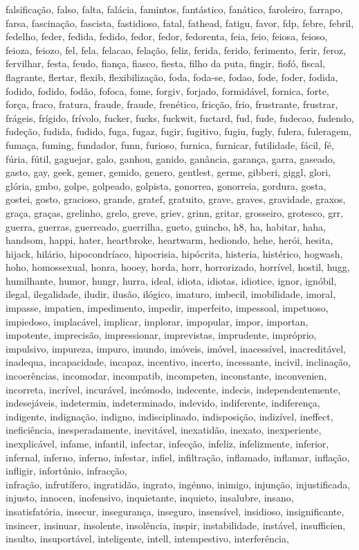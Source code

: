 falsificação, falso, falta, falácia, famintos, fantástico, fanático, faroleiro, farrapo, farsa, fascinação, fascista, fastidioso, fatal, fathead, fatigu, favor, fdp, febre, febril, fedelho, feder, fedida, fedido, fedor, fedor, fedorenta, feia, feio, feiosa, feioso, feioza, feiozo, fel, fela, felacao, felação, feliz, ferida, ferido, ferimento, ferir, feroz, fervilhar, festa, feudo, fiança, fiasco, fiesta, filho da puta, fingir, fiofó, fiscal, flagrante, flertar, flexib, flexibilização, foda, foda-se, fodao, fode, foder, fodida, fodido, fodido, fodão, fofoca, fome, forgiv, forjado, formidável, fornica, forte, força, fraco, fratura, fraude, fraude, frenético, fricção, frio, frustrante, frustrar, frágeis, frígido, frívolo, fucker, fucks, fuckwit, fuctard, fud, fude, fudecao, fudendo, fudeção, fudida, fudido, fuga, fugaz, fugir, fugitivo, fugiu, fugly, fulera, fuleragem, fumaça, fuming, fundador, funn, furioso, furnica, furnicar, futilidade, fácil, fé, fúria, fútil, gaguejar, galo, ganhou, ganido, ganância, garança, garra, gaseado, gasto, gay, geek, gemer, gemido, genero, gentlest, germe, gibberi, giggl, glori, glória, gmbo, golpe, golpeado, golpista, gonorrea, gonorreia, gordura, gosta, gostei, gosto, gracioso, grande, gratef, gratuito, grave, graves, gravidade, graxos, graça, graças, grelinho, grelo, greve, griev, grinn, gritar, grosseiro, grotesco, grr, guerra, guerras, guerreado, guerrilha, gueto, guincho, h8, ha, habitar, haha, handsom, happi, hater, heartbroke, heartwarm, hediondo, hehe, herói, hesita, hijack, hilário, hipocondríaco, hipocrisia, hipócrita, histeria, histérico, hogwash, hoho, homossexual, honra, hooey, horda, horr, horrorizado, horrível, hostil, hugg, humilhante, humor, hungr, hurra, ideal, idiota, idiotas, idiotice, ignor, ignóbil, ilegal, ilegalidade, iludir, ilusão, ilógico, imaturo, imbecil, imobilidade, imoral, impasse, impatien, impedimento, impedir, imperfeito, impessoal, impetuoso, impiedoso, implacável, implicar, implorar, impopular, impor, importan, impotente, imprecisão, impressionar, imprevistas, imprudente, impróprio, impulsivo, impureza, impuro, imundo, imóveis, imóvel, inacessível, inacreditável, inadequa, incapacidade, incapaz, incentivo, incerto, incessante, incivil, inclinação, incoerências, incomodar, incompatib, incompeten, inconstante, inconvenien, incorreta, incrível, incurável, incómodo, indecente, indecis, independentemente, indesejáveis, indetermin, indeterminado, indevido, indiferente, indiferença, indigente, indignação, indigno, indisciplinado, indisposição, indizível, ineffect, ineficiência, inesperadamente, inevitável, inexatidão, inexato, inexperiente, inexplicável, infame, infantil, infectar, infecção, infeliz, infelizmente, inferior, infernal, inferno, inferno, infestar, infiel, infiltração, inflamado, inflamar, inflação, infligir, infortúnio, infracção, \\ infração, infrutífero, ingratidão, ingrato, ingénuo, inimigo, injunção, injustificada, injusto, innocen, inofensivo, inquietante, inquieto, insalubre, insano, insatisfatória, insecur, insegurança, inseguro, insensível, insidioso, insignificante, insincer, insinuar, insolente, insolência, inspir, instabilidade, instável, insufficien, insulto, insuportável, inteligente, intell, intempestivo, interferência, 